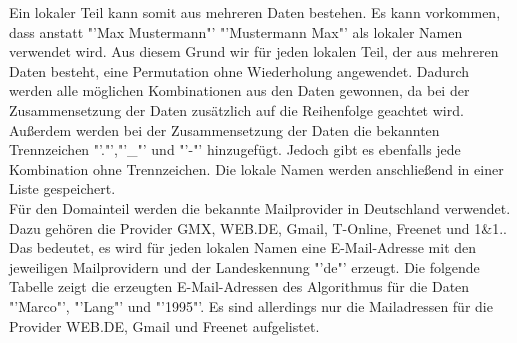 	Ein lokaler Teil kann somit aus mehreren Daten bestehen. Es kann vorkommen, dass anstatt "'Max Mustermann"' "'Mustermann Max"' als lokaler Namen verwendet wird. Aus diesem Grund wir für jeden lokalen Teil, der aus mehreren Daten besteht, eine Permutation ohne Wiederholung angewendet. Dadurch werden alle möglichen Kombinationen aus den Daten gewonnen, da bei der Zusammensetzung der Daten zusätzlich auf die Reihenfolge geachtet wird. Außerdem werden bei der Zusammensetzung der Daten die bekannten Trennzeichen "'."',"'\_"' und "'-"' hinzugefügt. Jedoch gibt es ebenfalls jede Kombination ohne Trennzeichen. Die lokale Namen werden anschließend in einer Liste gespeichert.\\
	Für den Domainteil werden die bekannte Mailprovider in Deutschland verwendet.  Dazu gehören die Provider GMX, WEB.DE, Gmail, T-Online, Freenet und 1\&1.\cite{AnbieterMail}. Das bedeutet, es wird für jeden lokalen Namen eine E-Mail-Adresse mit den jeweiligen Mailprovidern und der Landeskennung "'de"' erzeugt. Die folgende Tabelle  zeigt die erzeugten E-Mail-Adressen des Algorithmus für die Daten "'Marco"', "'Lang"' und "'1995"'. Es sind allerdings nur die Mailadressen für die Provider WEB.DE, Gmail und Freenet aufgelistet.
	
